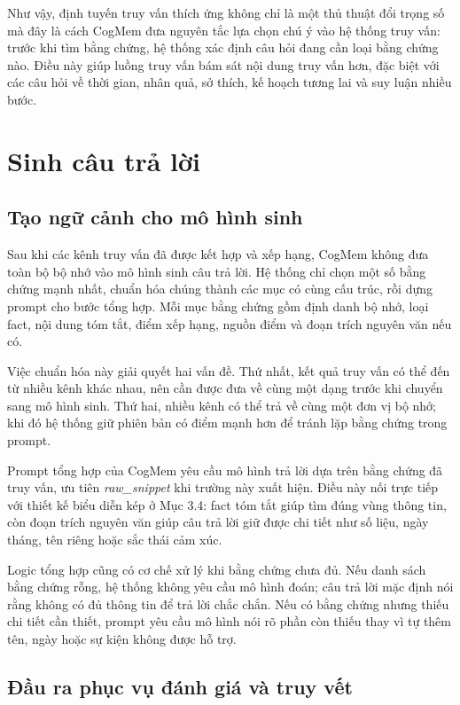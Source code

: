 \documentclass[../main.tex]{subfiles}
\begin{document}
Như vậy, định tuyến truy vấn thích ứng không chỉ là một thủ thuật đổi trọng số mà đây là cách CogMem đưa nguyên tắc lựa chọn chú ý vào hệ thống truy vấn: trước khi tìm bằng chứng, hệ thống xác định câu hỏi đang cần loại bằng chứng nào. Điều này giúp luồng truy vấn bám sát nội dung truy vấn hơn, đặc biệt với các câu hỏi về thời gian, nhân quả, sở thích, kế hoạch tương lai và suy luận nhiều bước.

\section{Sinh câu trả lời}

\subsection{Tạo ngữ cảnh cho mô hình sinh}

Sau khi các kênh truy vấn đã được kết hợp và xếp hạng, CogMem không đưa toàn bộ bộ nhớ vào mô hình sinh câu trả lời. Hệ thống chỉ chọn một số bằng chứng mạnh nhất, chuẩn hóa chúng thành các mục có cùng cấu trúc, rồi dựng prompt cho bước tổng hợp. Mỗi mục bằng chứng gồm định danh bộ nhớ, loại fact, nội dung tóm tắt, điểm xếp hạng, nguồn điểm và đoạn trích nguyên văn nếu có.

Việc chuẩn hóa này giải quyết hai vấn đề. Thứ nhất, kết quả truy vấn có thể đến từ nhiều kênh khác nhau, nên cần được đưa về cùng một dạng trước khi chuyển sang mô hình sinh. Thứ hai, nhiều kênh có thể trả về cùng một đơn vị bộ nhớ; khi đó hệ thống giữ phiên bản có điểm mạnh hơn để tránh lặp bằng chứng trong prompt.

Prompt tổng hợp của CogMem yêu cầu mô hình trả lời dựa trên bằng chứng đã truy vấn, ưu tiên \textit{raw\_snippet} khi trường này xuất hiện. Điều này nối trực tiếp với thiết kế biểu diễn kép ở Mục 3.4: fact tóm tắt giúp tìm đúng vùng thông tin, còn đoạn trích nguyên văn giúp câu trả lời giữ được chi tiết như số liệu, ngày tháng, tên riêng hoặc sắc thái cảm xúc.

Logic tổng hợp cũng có cơ chế xử lý khi bằng chứng chưa đủ. Nếu danh sách bằng chứng rỗng, hệ thống không yêu cầu mô hình đoán; câu trả lời mặc định nói rằng không có đủ thông tin để trả lời chắc chắn. Nếu có bằng chứng nhưng thiếu chi tiết cần thiết, prompt yêu cầu mô hình nói rõ phần còn thiếu thay vì tự thêm tên, ngày hoặc sự kiện không được hỗ trợ.

\subsection{Đầu ra phục vụ đánh giá và truy vết}
\end{document}
